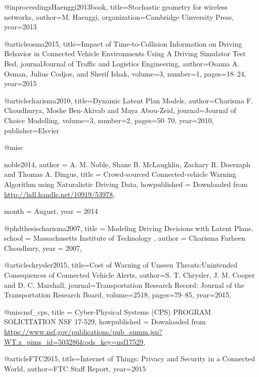 {{{{@inproceedings{Haenggi2013book,
	title={Stochastic geometry for wireless networks},
	author={M. Haenggi},
	organization={Cambridge Uinversity Press},
	year={2013}
}



@article{osma2015,
	title={Impact of Time-to-Collision Information on Driving Behavior in Connected Vehicle Environments Using A Driving Simulator Test Bed},
	journal{Journal of Traffic and Logistics Engineering},
	author={Osama A. Osman, Julius Codjoe, and Sherif Ishak},
	volume={3},
	number={1},
	pages={18--24},
	year={2015}
}


@article{charisma2010,
	title={Dynamic Latent Plan Models},
	author={Charisma F. Choudhurya, Moshe Ben-Akivab and Maya Abou-Zeid},
	journal={Journal of Choice Modelling},
	volume={3},
	number={2},
	pages={50--70},
	year={2010},
	publisher={Elsvier}
}


@misc{noble2014,
	author = {A. M. Noble, Shane B. McLaughlin, Zachary R. Doerzaph and Thomas A. Dingus},
	title = {Crowd-sourced Connected-vehicle Warning Algorithm using Naturalistic Driving Data},
	howpublished = {Downloaded from \url{http://hdl.handle.net/10919/53978}},
	
	month = August,
	year = 2014
}


@phdthesis{charisma2007,
	title    = {Modeling Driving Decisions with Latent Plans},
	school   = {Massachusetts Institute of Technology },
	author   = {Charisma Farheen Choudhury},
	year     = {2007}, %
}


@article{chrysler2015,
	title={Cost of Warning of Unseen Threats:Unintended Consequences of Connected Vehicle Alerts},
	author={S. T. Chrysler, J. M. Cooper and D. C. Marshall},
	journal={Transportation Research Record: Journal of the Transportation Research Board},
	volume={2518},
	pages={79--85},
	year={2015},
}

@misc{nsf_cps,
	title = {Cyber-Physical Systems (CPS) PROGRAM SOLICITATION NSF 17-529},
	howpublished = {Downloaded from \url{https://www.nsf.gov/publications/pub_summ.jsp?WT.z_pims_id=503286&ods_key=nsf17529}},
}







@article{FTC2015,
	title={Internet of Things: Privacy and Security in a Connected World},
	author={FTC Staff Report},
	year={2015}
}



}}}}

